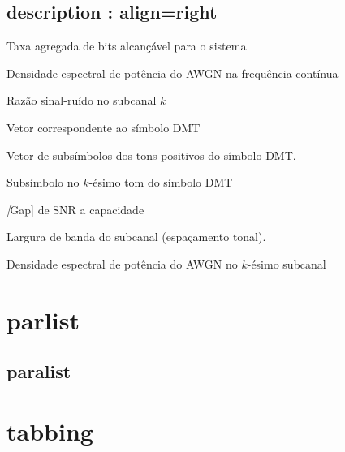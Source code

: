 \documentclass[12pt, a4paper, oneside]{book}
\let\stdsection\section
\renewcommand\section{\newpage\stdsection}
\begin{document}
	\section{description : align=right}
		\begin{description}[labelsep=3em, align=right]
		\setlength\topsep{0.0em}
		\setlength\itemsep{-1.0em}

		\item[$b$] Taxa agregada de bits alcançável para o sistema
		\item[$Sn(f)$] Densidade espectral de potência do AWGN na frequência contínua
		\item[$\text{SNR}_k$] Razão sinal-ruído no subcanal $k$
		\item[$\mathbf{X}$] Vetor correspondente ao símbolo DMT
		\item[$\mathbf{X}_+$] Vetor de subsímbolos dos tons positivos do símbolo DMT.
		\item[$X_k$] Subsímbolo no $k$-ésimo tom do símbolo DMT
		\item[$\Gamma$] \textsl[Gap] de SNR a capacidade
		\item[$\Delta f$] Largura de banda do subcanal (espaçamento tonal).
		\item[$\sigma_k$] Densidade espectral de potência do AWGN no $k$-ésimo subcanal
		\end{description}




	\chapter{parlist}



\section{paralist}





	\chapter{tabbing}
\end{document}
